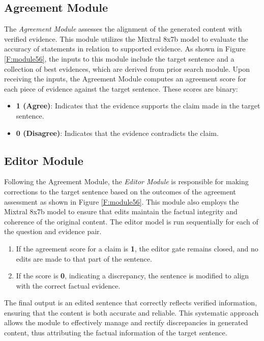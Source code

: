 \documentclass[11pt]{article}
\begin{document}
	\subsection{Agreement Module}
	
	The \emph{Agreement Module} assesses the alignment of the generated content with verified evidence. This module utilizes the Mixtral 8x7b model to evaluate the accuracy of statements in relation to supported evidence. As shown in Figure \ref{F:module56}, the inputs to this module include the target sentence and a collection of best evidences, which are derived from prior search module. Upon receiving the inputs, the Agreement Module computes an agreement score for each piece of evidence against the target sentence. These scores are binary:
	
	\begin{itemize}
		\item \textbf{1 (Agree)}: Indicates that the evidence supports the claim made in the target sentence.
		\item \textbf{0 (Disagree)}: Indicates that the evidence contradicts the claim.
	\end{itemize}
	
	\subsection{Editor Module}
	
	Following the Agreement Module, the \emph{Editor Module} is responsible for making corrections to the target sentence based on the outcomes of the agreement assessment as shown in Figure \ref{F:module56}. This module also employs the Mixtral 8x7b model to ensure that edits maintain the factual integrity and coherence of the original content. The editor model is run sequentially for each of the question and evidence pair.
	
	\begin{enumerate}
		\item If the agreement score for a claim is \textbf{1}, the editor gate remains closed, and no edits are made to that part of the sentence.
		\item If the score is \textbf{0}, indicating a discrepancy, the sentence is modified to align with the correct factual evidence.
	\end{enumerate}
	
	The final output is an edited sentence that correctly reflects verified information, ensuring that the content is both accurate and reliable. This systematic approach allows the module to effectively manage and rectify discrepancies in generated content, thus attributing the factual information of the target sentence.
	
\end{document}
